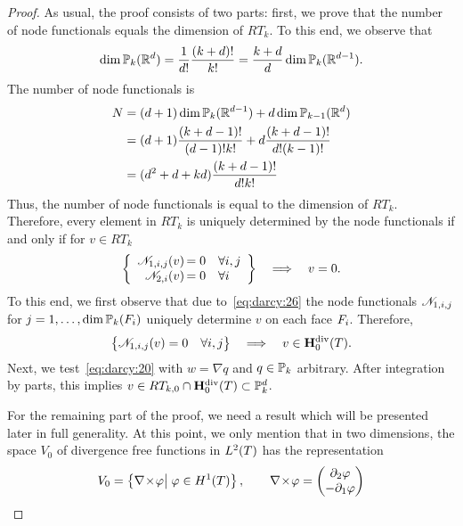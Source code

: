 \begin{proof}
  As usual, the proof consists of two parts: first, we prove that the
  number of node functionals equals the dimension of $RT_k$. To this
  end, we observe that
  \begin{gather}
    \label{eq:darcy:32}
    \dim \P_k(\R^d) = \frac1{d!} \frac{(k+d)!}{k!}
    = \frac{k+d}d \dim \P_k(\R^{d-1}).
  \end{gather}
  The number of node functionals is
  \begin{align}
    N &= (d+1) \dim \P_k(\R^{d-1}) + d \dim \P_{k-1}(\R^d)
    \\
    &= (d+1)\frac{(k+d-1)!}{(d-1)!k!}
      + d\frac{(k+d-1)!}{d! (k-1)!}\\
    &= (d^2+d+k d)\frac{(k+d-1)!}{d!k!}
  \end{align}
  Thus, the number of node functionals is equal to the dimension of
  $RT_k$. Therefore, every element in $RT_k$ is uniquely determined
  by the node functionals if and only if for $v\in RT_k$
  \begin{gather}
    \left\{
      \begin{array}{r@{\,}ll}
        \nodal_{1,i,j}(v) &=0 &\forall i,j
        \\
        \nodal_{2,i}(v) &=0 &\forall i
      \end{array}
      \right\}
      \quad\Longrightarrow\quad
      v=0.
  \end{gather}
  To this end, we first observe that due to~\eqref{eq:darcy:26} the
  node functionals $\nodal_{1,i,j}$ for $j=1,\dots,\dim \P_k(\face_i)$
 uniquely determine $v$ on each face $\face_i$. Therefore,
 \begin{gather}
   \bigl\{\nodal_{1,i,j}(v) =0 \quad\forall i,j\bigr\}
   \quad\Longrightarrow\quad
   v\in \Hdiv_0(\cell).
 \end{gather}
 Next, we test~\eqref{eq:darcy:20} with $w=\nabla q$ and $q\in
 \P_k$ arbitrary. After integration by parts, this implies $v\in
 RT_{k,0} \cap \Hdiv_0(\cell) \subset \P_k^d$.

 For the remaining part of the proof, we need a result which will be
 presented later in full generality. At this point, we only mention
 that in two dimensions, the space $V_0$ of divergence free functions
 in $L^2(\cell)$ has the representation
 \begin{gather}
   \label{eq:darcy:34}
   V_0 = \left\{ \vcurl \phi
     \big\vert \; \phi\in H^1(\cell) \right\},
   \qquad
   \vcurl \phi = \begin{pmatrix}
     \d_2 \phi \\ -\d_1 \phi
   \end{pmatrix}
 \end{gather}


\end{proof}
